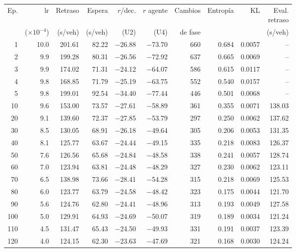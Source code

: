 \begin{table}[H]
\centering
\scriptsize
\setlength{\tabcolsep}{3pt}
\setlength{\tabcolsep}{2pt}
\begin{tabular}{rrrrrrrrrr}
\toprule
Ep. & lr & Retraso & Espera & $r$/dec. & $r$ agente & Cambios & Entropía & KL & \makecell{Eval.\\retraso} \\
 & ($\times 10^{-4}$) & (s/veh) & (s/veh) & (U2) & (U4) & de fase &  &  & (s/veh) \\
\midrule
1 & 10.0 & 201.61 & 82.22 & $-$26.88 & $-$73.70 & 660 & 0.684 & 0.0057 & -- \\
2 & 9.9 & 199.28 & 80.31 & $-$26.56 & $-$72.92 & 637 & 0.665 & 0.0069 & -- \\
3 & 9.9 & 174.02 & 71.31 & $-$24.12 & $-$64.07 & 586 & 0.615 & 0.0117 & -- \\
4 & 9.8 & 168.85 & 71.79 & $-$25.19 & $-$63.75 & 552 & 0.540 & 0.0157 & -- \\
5 & 9.8 & 199.01 & 92.54 & $-$34.40 & $-$77.44 & 446 & 0.501 & 0.0068 & -- \\
10 & 9.6 & 153.00 & 73.57 & $-$27.61 & $-$58.89 & 361 & 0.355 & 0.0071 & 138.03 \\
20 & 9.1 & 139.60 & 72.37 & $-$27.85 & $-$53.79 & 297 & 0.250 & 0.0062 & 137.62 \\
30 & 8.5 & 130.05 & 68.91 & $-$26.18 & $-$49.64 & 305 & 0.206 & 0.0053 & 131.35 \\
40 & 8.1 & 125.77 & 63.67 & $-$24.44 & $-$49.15 & 335 & 0.218 & 0.0083 & 126.37 \\
50 & 7.6 & 126.56 & 65.68 & $-$24.84 & $-$48.58 & 338 & 0.241 & 0.0057 & 128.74 \\
60 & 7.0 & 123.94 & 63.81 & $-$24.48 & $-$48.29 & 327 & 0.230 & 0.0062 & 123.11 \\
70 & 6.5 & 138.98 & 73.66 & $-$28.41 & $-$54.28 & 315 & 0.218 & 0.0069 & 125.53 \\
80 & 6.0 & 123.77 & 63.79 & $-$24.58 & $-$48.42 & 323 & 0.175 & 0.0044 & 121.70 \\
90 & 5.6 & 124.76 & 62.80 & $-$24.41 & $-$48.96 & 313 & 0.193 & 0.0049 & 127.58 \\
100 & 5.0 & 129.91 & 64.93 & $-$24.69 & $-$50.07 & 319 & 0.189 & 0.0034 & 121.24 \\
110 & 4.5 & 131.47 & 65.43 & $-$24.50 & $-$49.93 & 331 & 0.191 & 0.0037 & 123.39 \\
120 & 4.0 & 124.15 & 62.30 & $-$23.63 & $-$47.69 & 321 & 0.168 & 0.0030 & 124.24 \\

\end{tabular}
\end{table}

